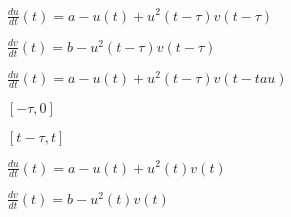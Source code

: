 \documentclass{article}
\begin{document}
$ \frac{du}{dt}(t) = a - u(t) + u^2(t-\tau)v(t-\tau) $
\pagebreak

$ \frac{dv}{dt}(t) = b - u^2(t-\tau)v(t-\tau) $
\pagebreak

$ \frac{du}{dt}(t) = a - u(t) + u^2(t-\tau)v(t-tau) $
\pagebreak

$ [-\tau, 0] $
\pagebreak

$[t-\tau, t]$
\pagebreak

$ \frac{du}{dt}(t) = a - u(t) + u^2(t)v(t) $
\pagebreak

$ \frac{dv}{dt}(t) = b - u^2(t)v(t) $
\pagebreak
\end{document}
